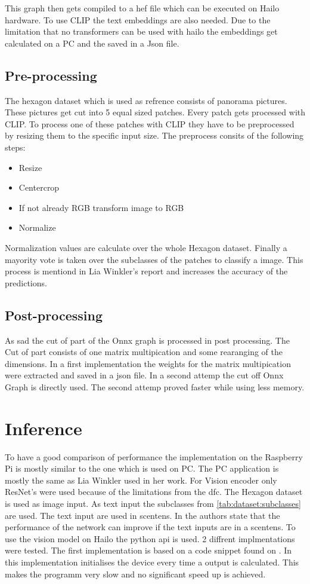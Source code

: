 This graph then gets compiled to a \acrshort{hef} file which can be executed on Hailo hardware.
To use CLIP the text embeddings are also needed.
Due to the limitation that no transformers can be used with hailo the embeddings get calculated on a PC and the saved in a Json file.

\subsection{Pre-processing}

The hexagon dataset which is used as refrence consists of panorama pictures.
These pictures get cut into 5 equal sized patches.
Every patch gets processed with CLIP.
To process one of these patches with CLIP they have to be preprocessed by resizing them to the specific input size.
The preprocess consits of the following steps:
\begin{itemize}
    \item Resize
    \item Centercrop
    \item If not already RGB transform image to RGB
    \item Normalize
\end{itemize}
Normalization values are calculate over the whole Hexagon dataset.
Finally a mayority vote is taken over the subclasses of the patches to classify a image.
This process is mentiond in Lia Winkler's report and increases the accuracy of the predictions.

\subsection{Post-processing}

As sad the cut of part of the Onnx graph is processed in post processing.
The Cut of part consists of one matrix multipication and some rearanging of the dimensions.
In a first implementation the weights for the matrix multipication were extracted and saved in a json file.
In a second attemp the cut off Onnx Graph is directly used.
The second attemp proved faster while using less memory.


\section{Inference}

To have a good comparison of performance the implementation on the Raspberry Pi is mostly similar to the one which is used on PC.
The PC application is mostly the same as Lia Winkler used in her work.
For Vision encoder only ResNet's were used because of the limitations from the \acrshort{dfc}.
The Hexagon dataset is used as image input.
As text input the subclasses from \cref{tab:dataset:subclasses} are used.
The text input are used in scentens.
In \cite{clip} the authors state that the performance of the network can improve if the text inputs are in a scentens.
To use the vision model on Hailo the python api is used.
2 diffrent implmentations were tested.
The first implementation is based on a code snippet found on \cite{hailoimplementation}.
In this implementation initialises the device every time a output is calculated.
This makes the programm very slow and no significant speed up is achieved.

